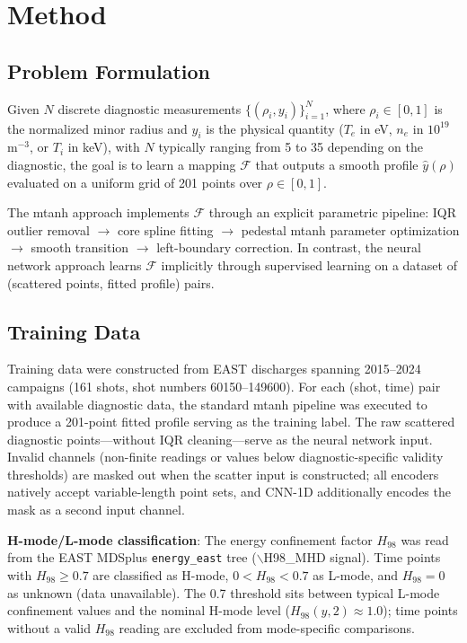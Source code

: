 \documentclass[a4paper,12pt]{article}
\begin{document}
\section{Method}

\subsection{Problem Formulation}

Given $N$ discrete diagnostic measurements $\{(\rho_i, y_i)\}_{i=1}^N$, where $\rho_i \in [0, 1]$ is the normalized minor radius and $y_i$ is the physical quantity ($T_e$ in eV, $n_e$ in $10^{19}$ m$^{-3}$, or $T_i$ in keV), with $N$ typically ranging from 5 to 35 depending on the diagnostic, the goal is to learn a mapping $\mathcal{F}$ that outputs a smooth profile $\hat{y}(\rho)$ evaluated on a uniform grid of 201 points over $\rho \in [0, 1]$.

The mtanh approach implements $\mathcal{F}$ through an explicit parametric pipeline: IQR outlier removal $\to$ core spline fitting $\to$ pedestal mtanh parameter optimization $\to$ smooth transition $\to$ left-boundary correction. In contrast, the neural network approach learns $\mathcal{F}$ implicitly through supervised learning on a dataset of (scattered points, fitted profile) pairs.

\subsection{Training Data}

Training data were constructed from EAST discharges spanning 2015--2024 campaigns (161 shots, shot numbers 60150--149600). For each (shot, time) pair with available diagnostic data, the standard mtanh pipeline was executed to produce a 201-point fitted profile serving as the training label. The raw scattered diagnostic points---without IQR cleaning---serve as the neural network input. Invalid channels (non-finite readings or values below diagnostic-specific validity thresholds) are masked out when the scatter input is constructed; all encoders natively accept variable-length point sets, and CNN-1D additionally encodes the mask as a second input channel.

\textbf{H-mode/L-mode classification}: The energy confinement factor $H_{98}$ was read from the EAST MDSplus \texttt{energy\_east} tree ($\backslash$H98\_MHD signal). Time points with $H_{98} \geq 0.7$ are classified as H-mode, $0 < H_{98} < 0.7$ as L-mode, and $H_{98} = 0$ as unknown (data unavailable). The 0.7 threshold sits between typical L-mode confinement values and the nominal H-mode level ($H_{98}(y,2) \approx 1.0$); time points without a valid $H_{98}$ reading are excluded from mode-specific comparisons.
\end{document}
